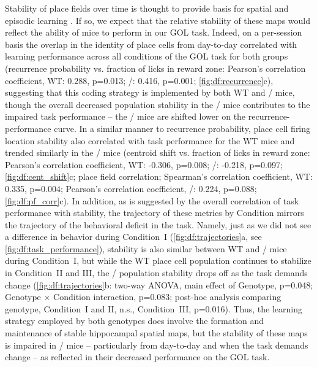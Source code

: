 Stability of place fields over time is thought to provide basis for spatial and episodic learning \citep{Kentros2004, Mankin2012, Thompson1990, Ziv2013}.
If so, we expect that the relative stability of these maps would reflect the ability of mice to perform in our GOL task. Indeed, on a per-session basis the overlap in the identity of place cells from day-to-day correlated with learning performance across all conditions of the GOL task for both groups (recurrence probability vs. fraction of licks in reward zone: Pearson's correlation coefficient, WT: 0.288, p=0.013; \df/: 0.416, p=0.001; \autoref{fig:df:recurrence}c), suggesting that this coding strategy is implemented by both WT and \df/ mice, though the overall decreased population stability in the \df/ mice contributes to the impaired task performance -- the \df/  mice are shifted lower on the recurrence-performance curve. In a similar manner to recurrence probability, place cell firing location stability also correlated with task performance for the WT mice and trended similarly in the \df/ mice (centroid shift vs. fraction of licks in reward zone: Pearson's correlation coefficient, WT: -0.306, p=0.008; \df/: -0.218, p=0.097; \autoref{fig:df:cent_shift}c; place field correlation; Spearman's correlation coefficient, WT: 0.335, p=0.004; Pearson's correlation coefficient, \df/: 0.224, p=0.088; \autoref{fig:df:pf_corr}c). In addition, as is suggested by the overall correlation of task performance with stability, the trajectory of these metrics by Condition mirrors the trajectory of the behavioral deficit in the task. Namely, just as we did not see a difference in behavior during Condition~I (\autoref{fig:df:trajectories}a, see \autoref{fig:df:task_performance}), stability is also similar between WT and \df/  mice during Condition~I, but while the WT place cell population continues to stabilize in Condition~II and III, the \df/ population stability drops off as the task demands change (\autoref{fig:df:trajectories}b: two-way ANOVA, main effect of Genotype, p=0.048; Genotype $\times$ Condition interaction, p=0.083; post-hoc analysis comparing genotype, Condition~I and II, n.s., Condition~III, p=0.016). Thus, the learning strategy employed by both genotypes does involve the formation and maintenance of stable hippocampal spatial maps, but the stability of these maps is impaired in \df/ mice -- particularly from day-to-day and when the task demands change -- as reflected in their decreased performance on the GOL task.

